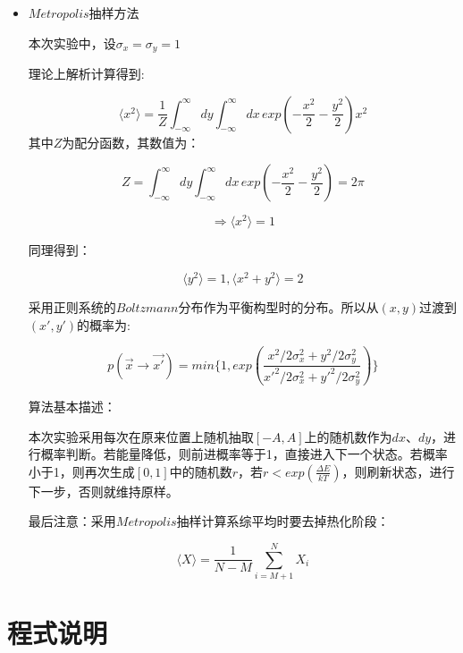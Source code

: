 \documentclass[UTF8]{ctexart}
\begin{document}
	\begin{itemize}
		\item $Metropolis$抽样方法
		
		本次实验中，设$\sigma_x=\sigma_y=1$
		
		理论上解析计算得到:
		
		$$\langle x^2 \rangle=\frac{1}{Z}\int_{-\infty}^\infty dy \int_{-\infty}^\infty dx\,exp\left(-\frac{x^2}{2}-\frac{y^2}{2}  \right)x^2 $$
		其中$Z$为配分函数，其数值为：
		
		$$Z=\int_{-\infty}^\infty dy \int_{-\infty}^\infty dx\,exp\left(-\frac{x^2}{2}-\frac{y^2}{2}  \right)=2\pi $$
		
		$$\Rightarrow \langle x^2 \rangle=1$$
		
		同理得到：
		
		$$\langle y^2 \rangle=1,\langle x^2+y^2 \rangle=2$$
		
		
		采用正则系统的$Boltzmann$分布作为平衡构型时的分布。所以从$(x,y)$过渡到$(x',y')$的概率为:
		
		$$p(\vec{x}\rightarrow\vec{x'})=min\{1,exp(\frac{x^2/2\sigma_x^2+y^2/2\sigma_y^2}{x'^2/2\sigma_x^2+y'^2/2\sigma_y^2})\}$$
		
		算法基本描述：
		
		本次实验采用每次在原来位置上随机抽取$[-A,A]$上的随机数作为$dx$、$dy$，进行概率判断。若能量降低，则前进概率等于1，直接进入下一个状态。若概率小于1，则再次生成$[0,1]$中的随机数$r$，若$r<exp(\frac{\Delta E}{kT})$，则刷新状态，进行下一步，否则就维持原样。
		
%	

	最后注意：采用$Metropolis$抽样计算系综平均时要去掉热化阶段：
	
	$$\langle X \rangle=\frac{1}{N-M}\sum_{i=M+1}^{N} X_i$$
	
	
	
\end{itemize}
	
	\section{程式说明}
	
\end{document}
